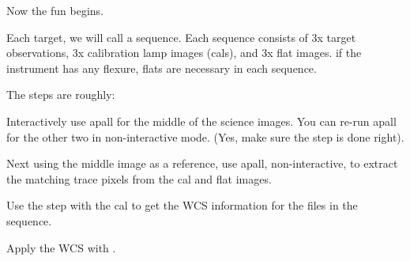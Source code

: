 Now the fun begins.



Each target, we will call a sequence. Each sequence consists
of 3x target observations, 3x calibration lamp images (cals),
and 3x flat images. if the instrument has any flexure, flats
are necessary in each sequence.

The steps are roughly:

Interactively use apall for the middle of the science images. You can re-run apall
for the other two in non-interactive mode. (Yes, make sure the step is done right).

Next using the middle image as a reference, use apall,
non-interactive, to extract the matching trace pixels from the cal and flat images.

Use the  step with the cal to get the WCS information for the
files in the sequence. 

Apply the WCS with . 

